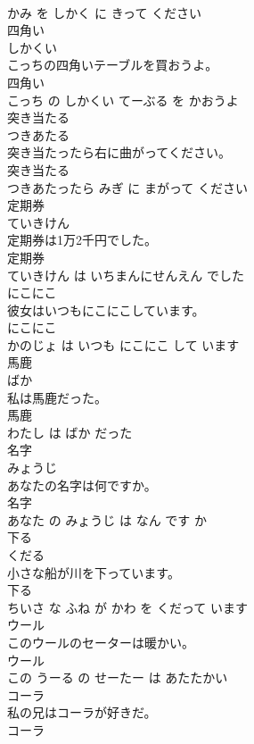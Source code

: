 \documentclass[8pt]{extreport}
\begin{document}
\begin{CJK}{UTF8}{min}
\\	かみ を しかく に きって ください			
\\	四角い	
\\	しかくい			
\\	こっちの四角いテーブルを買おうよ。	
\\	四角い 
\\	こっち の しかくい てーぶる を かおうよ			
\\	突き当たる	
\\	つきあたる			
\\	突き当たったら右に曲がってください。	
\\	突き当たる 
\\	つきあたったら みぎ に まがって ください			
\\	定期券	
\\	ていきけん			
\\	定期券は1万2千円でした。	
\\	定期券 
\\	ていきけん は いちまんにせんえん でした			
\\	にこにこ	
\\	彼女はいつもにこにこしています。	
\\	にこにこ 
\\	かのじょ は いつも にこにこ して います			
\\	馬鹿	
\\	ばか			
\\	私は馬鹿だった。	
\\	馬鹿 
\\	わたし は ばか だった			
\\	名字	
\\	みょうじ			
\\	あなたの名字は何ですか。	
\\	名字 
\\	あなた の みょうじ は なん です か			
\\	下る	
\\	くだる			
\\	小さな船が川を下っています。	
\\	下る 
\\	ちいさ な ふね が かわ を くだって います			
\\	ウール	
\\	このウールのセーターは暖かい。	
\\	ウール 
\\	この うーる の せーたー は あたたかい			
\\	コーラ	
\\	私の兄はコーラが好きだ。	
\\	コーラ 

\end{CJK}
\end{document}
